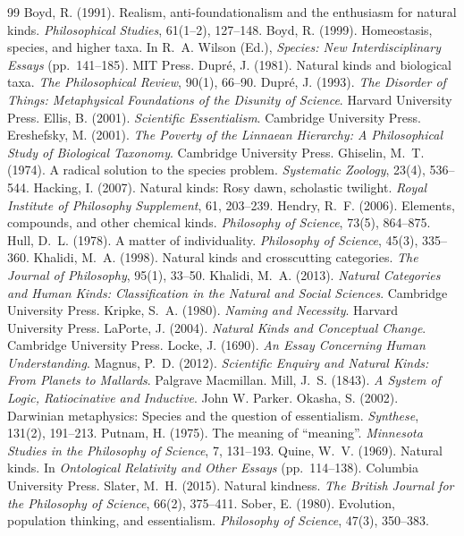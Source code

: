 \documentclass{situationist-preprint}
\begin{document}
\begin{thebibliography}{99}\small
{} Boyd, R. (1991). Realism, anti-foundationalism and the enthusiasm for natural kinds. \emph{Philosophical Studies}, 61(1--2), 127--148.
 Boyd, R. (1999). Homeostasis, species, and higher taxa. In R.~A. Wilson (Ed.), \emph{Species: New Interdisciplinary Essays} (pp.~141--185). MIT Press.
 Dupr\'e, J. (1981). Natural kinds and biological taxa. \emph{The Philosophical Review}, 90(1), 66--90.
 Dupr\'e, J. (1993). \emph{The Disorder of Things: Metaphysical Foundations of the Disunity of Science}. Harvard University Press.
 Ellis, B. (2001). \emph{Scientific Essentialism}. Cambridge University Press.
 Ereshefsky, M. (2001). \emph{The Poverty of the Linnaean Hierarchy: A Philosophical Study of Biological Taxonomy}. Cambridge University Press.
 Ghiselin, M.~T. (1974). A radical solution to the species problem. \emph{Systematic Zoology}, 23(4), 536--544.
 Hacking, I. (2007). Natural kinds: Rosy dawn, scholastic twilight. \emph{Royal Institute of Philosophy Supplement}, 61, 203--239.
 Hendry, R.~F. (2006). Elements, compounds, and other chemical kinds. \emph{Philosophy of Science}, 73(5), 864--875.
 Hull, D.~L. (1978). A matter of individuality. \emph{Philosophy of Science}, 45(3), 335--360.
 Khalidi, M.~A. (1998). Natural kinds and crosscutting categories. \emph{The Journal of Philosophy}, 95(1), 33--50.
 Khalidi, M.~A. (2013). \emph{Natural Categories and Human Kinds: Classification in the Natural and Social Sciences}. Cambridge University Press.
 Kripke, S.~A. (1980). \emph{Naming and Necessity}. Harvard University Press.
 LaPorte, J. (2004). \emph{Natural Kinds and Conceptual Change}. Cambridge University Press.
 Locke, J. (1690). \emph{An Essay Concerning Human Understanding}.
 Magnus, P.~D. (2012). \emph{Scientific Enquiry and Natural Kinds: From Planets to Mallards}. Palgrave Macmillan.
 Mill, J.~S. (1843). \emph{A System of Logic, Ratiocinative and Inductive}. John W. Parker.
 Okasha, S. (2002). Darwinian metaphysics: Species and the question of essentialism. \emph{Synthese}, 131(2), 191--213.
 Putnam, H. (1975). The meaning of \enquote{meaning}. \emph{Minnesota Studies in the Philosophy of Science}, 7, 131--193.
 Quine, W.~V. (1969). Natural kinds. In \emph{Ontological Relativity and Other Essays} (pp.~114--138). Columbia University Press.
 Slater, M.~H. (2015). Natural kindness. \emph{The British Journal for the Philosophy of Science}, 66(2), 375--411.
 Sober, E. (1980). Evolution, population thinking, and essentialism. \emph{Philosophy of Science}, 47(3), 350--383.
\end{thebibliography}
\end{document}

